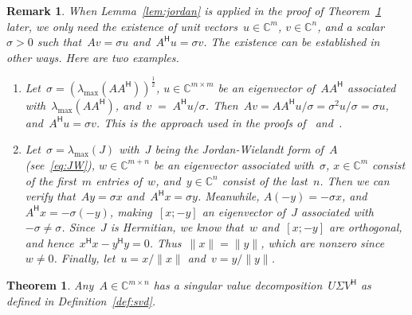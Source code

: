 \documentclass[11pt,a4paper]{article}  %
\numberwithin{equation}{section}
\newtheorem{theorem}{Theorem}%
\newtheorem{remark}{Remark}%
\theoremstyle{definition}
\def\CC{\mathbb{C}}
\newcommand{\hmt}{{\scriptscriptstyle{{\mathsf{H}}}}}
\begin{document}
\begin{remark}
  When Lemma~\ref{lem:jordan} is applied in the proof of Theorem~\ref{th:svd} later, we only need
  the existence of unit vectors~$u\in\CC^{m}$, $v\in\CC^{n}$, and a scalar~$\sigma>0$
  such that~$Av = \sigma u$ and~$A^\hmt u = \sigma v$. The existence can be established in other
  ways. Here are two examples.
  \begin{enumerate}[leftmargin=1.5em]
    \item Let~$\sigma = (\lambda_{\max}(AA^\hmt))^{\frac{1}{2}}$, $u\in\CC^{m\times m}$ be an eigenvector
      of~$AA^\hmt$ associated with~$\lambda_{\max}(AA^\hmt)$, and~$v\;=\;A^\hmt u/\sigma$.
      Then~$Av = AA^\hmt u/\sigma = \sigma^2 u/\sigma=\sigma u$, and~$A^\hmt u = \sigma v$.
      This is the approach used
      in the proofs of~\cite[Theorem~4.1]{Trefethen_Bau_1997} and~\cite[Theorem~1]{Koranyi_2001}.
    \item Let~$\sigma = \lambda_{\max}(J)$ with~$J$ being the Jordan-Wielandt form of~$A$
      \textnormal{(}see~\eqref{eq:JW}\textnormal{)}, $w\in\CC^{m+n}$ be an eigenvector associated with~$\sigma$,
      $x\in\CC^{m}$ consist of the first~$m$ entries of~$w$, and~$y\in\CC^{n}$ consist of the
      last~$n$. Then we can verify that~$Ay=\sigma x$ and~$A^\hmt x=\sigma y$.
      Meanwhile, $A(-y) = -\sigma x$, and~$A^\hmt x = -\sigma (-y)$, making~$[x; -y]$
      an eigenvector of~$J$ associated with~$-\sigma \neq \sigma$. Since~$J$ is Hermitian,
      we know that~$w$ and~$[x; -y]$ are orthogonal, and hence~$x^\hmt x - y^\hmt y= 0$. Thus~$\|x\|=\|y\|$,
    which are nonzero since~$w\neq 0$. Finally, let~$u = x/\|x\|$ and~$v = y/\|y\|$.
  \end{enumerate}
\end{remark}

\begin{theorem}
  \label{th:svd}
  Any~$A\in\CC^{m\times n}$ has a singular value decomposition~$U\Sigma V^\hmt$
  as defined in Definition~\ref{def:svd}.
\end{theorem}
\end{document}
